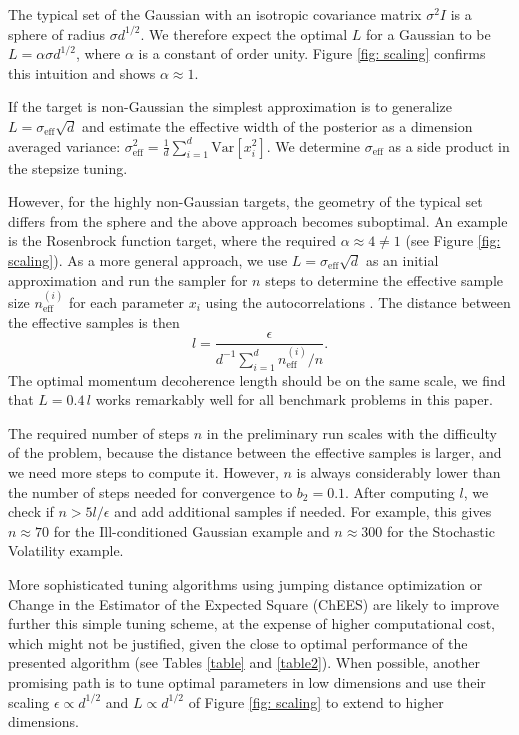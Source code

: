 \documentclass[twoside,11pt]{article}
\begin{document}
The typical set of the Gaussian with an isotropic covariance matrix $\sigma^2 I$ is a sphere of radius $\sigma d^{1/2}$. We therefore expect the optimal $L$ for a Gaussian to be $L = \alpha \sigma d^{1/2}$, where $\alpha$ is a constant of order unity. Figure \ref{fig: scaling} confirms this intuition and shows $\alpha \approx 1$.

If the target is non-Gaussian the simplest approximation is to generalize $L = \sigma_{\text{eff}} \sqrt{d}$ and estimate the effective width of the posterior as a dimension averaged variance: $\sigma_{\text{eff}}^2 = \frac{1}{d} \sum_{i = 1}^d \text{Var}[x_i^2]$. We determine $\sigma_{\text{eff}}$ as a side product in the stepsize tuning.

However, for the highly non-Gaussian targets, the geometry of the typical set differs from the sphere and the above approach becomes suboptimal. An example is the Rosenbrock function target, where the required $\alpha \approx 4 \neq 1$ (see Figure \ref{fig: scaling}). 
As a more general approach, we use $L = \sigma_{\text{eff}} \sqrt{d}$ as an initial approximation and run the sampler for $n$ steps to determine the effective sample size $n_{\text{eff}}^{(i)}$ for each parameter $x_i$ using the autocorrelations \citep{autocorr}. The distance between the effective samples is then 
\begin{equation}
    l = \frac{\epsilon}{d^{-1} \sum_{i = 1}^d n_{\text{eff}}^{(i)} / n}.
\end{equation}
The optimal momentum decoherence length should be on the same scale, we find that $L = 0.4 \, l$ works remarkably well for all benchmark problems in this paper.

The required number of steps $n$ in the preliminary run scales with the difficulty of the problem, because the distance between the effective samples is larger, and we need more steps to compute it. However, $n$ is always considerably lower than the number of steps needed for convergence to $b_2 = 0.1$. After computing $l$, we check if $n > 5 l / \epsilon$ and add additional samples if needed. For example, this gives $n \approx 70$ for the Ill-conditioned Gaussian example and $n \approx 300$ for the Stochastic Volatility example.  

More sophisticated tuning algorithms using jumping distance optimization \citep{NUTS} or Change in the Estimator of the Expected Square (ChEES) \citep{ChEES} are likely to improve further this simple tuning scheme, at the expense of higher computational cost, which might not be justified, given the close to optimal performance of the presented algorithm (see Tables \ref{table} and \ref{table2}).
When possible, another promising path is to tune optimal 
parameters in low dimensions and use their scaling $\epsilon \propto d^{1/2}$ and $L \propto d^{1/2}$ 
of Figure \ref{fig: scaling} to extend to higher dimensions.
\end{document}
